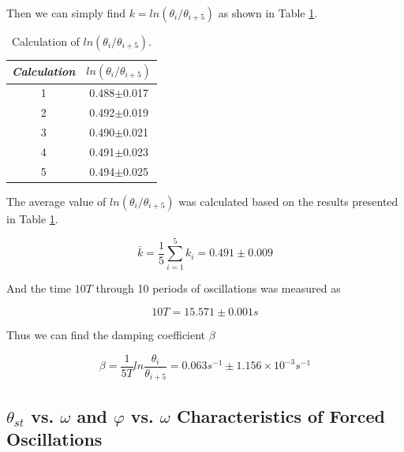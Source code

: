 \documentclass{article}
\begin{document}
Then we can simply find $k=ln(\theta_i/\theta_{i+5})$ as shown in Table \ref{tab-3}.

\begin{table}[!h]
\begin{center}
\begin{tabular}{cc}
\hline
\textit{Calculation} & $ln(\theta_i/\theta_{i+5})$ \\
\hline
1	&	0.488$\pm$0.017\\
2	&	0.492$\pm$0.019\\
3	&	0.490$\pm$0.021\\
4	&	0.491$\pm$0.023\\
5	&	0.494$\pm$0.025\\
\hline
\end{tabular}
\caption{Calculation of $ln(\theta_i/\theta_{i+5})$.}
\label{tab-3}
\end{center}
\end{table}

The average value of $ln(\theta_i/\theta_{i+5})$ was calculated based on the results presented in Table \ref{tab-3}.

$$\bar{k}=\frac{1}{5}\sum_{i=1}^5 k_i=0.491\pm0.009$$

And the time $10T$ through 10 periods of oscillations was measured as

$$10T=15.571\pm0.001s$$

Thus we can find the damping coefficient $\beta$

$$\beta=\frac{1}{5T}ln\frac{\theta_i}{\theta_{i+5}}=0.063s^{-1}\pm1.156\times10^{-3}s^{-1}$$

\newpage

\subsection{$ \theta_{st} $ vs. $ \omega $ and $ \varphi $ vs. $ \omega $ Characteristics of Forced Oscillations}
\end{document}
